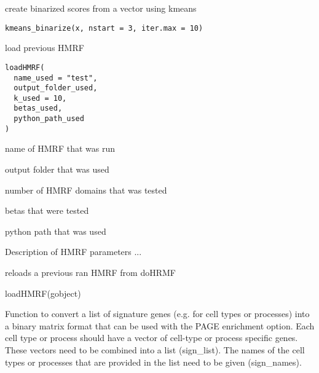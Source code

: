 \documentclass[a4paper]{book}
\begin{document}
%
\begin{Description}\relax
create binarized scores from a vector using kmeans
\end{Description}
%
\begin{Usage}
\begin{verbatim}
kmeans_binarize(x, nstart = 3, iter.max = 10)
\end{verbatim}
\end{Usage}
%
\begin{Description}\relax
load previous HMRF
\end{Description}
%
\begin{Usage}
\begin{verbatim}
loadHMRF(
  name_used = "test",
  output_folder_used,
  k_used = 10,
  betas_used,
  python_path_used
)
\end{verbatim}
\end{Usage}
%
\begin{Arguments}
\begin{ldescription}
\item[\code{name\_used}] name of HMRF that was run

\item[\code{output\_folder\_used}] output folder that was used

\item[\code{k\_used}] number of HMRF domains that was tested

\item[\code{betas\_used}] betas that were tested

\item[\code{python\_path\_used}] python path that was used
\end{ldescription}
\end{Arguments}
%
\begin{Details}\relax
Description of HMRF parameters ...
\end{Details}
%
\begin{Value}
reloads a previous ran HMRF from doHRMF
\end{Value}
%
\begin{Examples}
\begin{ExampleCode}
    loadHMRF(gobject)
\end{ExampleCode}
\end{Examples}
%
\begin{Description}\relax
Function to convert a list of signature genes (e.g. for cell types or processes) into
a binary matrix format that can be used with the PAGE enrichment option. Each cell type or process should
have a vector of cell-type or process specific genes. These vectors need to be combined into a list (sign\_list).
The names of the cell types or processes that are provided in the list need to be given (sign\_names).
\end{Description}
\end{document}
